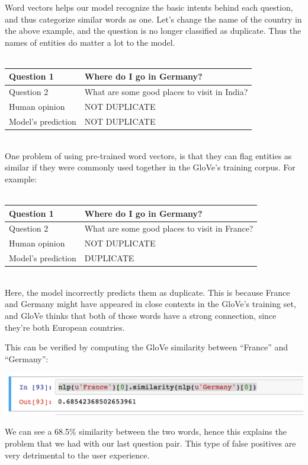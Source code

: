 \documentclass{article}
\begin{document}
Word vectors helps our model recognize the basic intents behind each question, and thus categorize similar words as one. Let's change the name of the country in the above example, and the question is no longer classified as duplicate. Thus the names of entities do matter a lot to the model.
\\\\
\begin{tabular}{|l|l|}
\hline
Question 1 & Where do I go in Germany? \\ \hline
Question 2 & What are some good places to visit in India? \\ \hline
Human opinion & NOT DUPLICATE \\ \hline
Model's prediction & NOT DUPLICATE \\ \hline
\end{tabular}\\

One problem of using pre-trained word vectors, is that they can flag entities as similar if they were commonly used together in the GloVe's training corpus. For example:
\\\\
\begin{tabular}{|l|l|}
\hline
Question 1 & Where do I go in Germany? \\ \hline
Question 2 & What are some good places to visit in France? \\ \hline
Human opinion & NOT DUPLICATE \\ \hline
Model's prediction & DUPLICATE \\ \hline
\end{tabular}\\

Here, the model incorrectly predicts them as duplicate. This is because France and Germany might have appeared in close contexts in the GloVe's training set, and GloVe thinks that both of those words have a strong connection, since they're both European countries.

This can be verified by computing the GloVe similarity between ``France'' and ``Germany'':

\noindent\includegraphics[width=\textwidth]{france_germany_similarity}

We can see a 68.5\% similarity between the two words, hence this explains the problem that we had with our last question pair. This type of false positives are very detrimental to the user experience.
\end{document}
